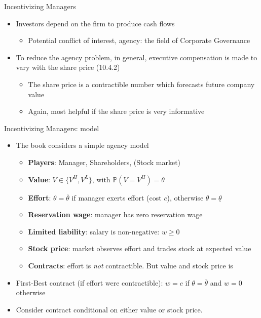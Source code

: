\documentclass[english,10pt
,aspectratio=169
]{beamer}
\begin{document}
\begin{frame}{Incentivizing Managers}
	\begin{itemize}
		\item Investors depend on the firm to produce cash flows 
		\begin{itemize}
			\item Potential conflict of interest, agency: the field of Corporate Governance
		\end{itemize}
		\item To reduce the agency problem, in general, executive compensation is made to vary with the share price (10.4.2)
		\begin{itemize}
			\item The share price is a contractible number which forecasts future company value
			\item Again, most helpful if the share price is very informative
		\end{itemize}
	\end{itemize}
\end{frame}


\begin{frame}{Incentivizing Managers: model}
	\begin{itemize}
		\item The book considers a simple agency model
		\begin{itemize}
			\item \textbf{Players}: Manager, Shareholders, (Stock market)
			\item \textbf{Value}: $V \in \{V^{H}, V^{L}\}$, with $\mathbb{P}(V=V^{H})=\theta$
			\item \textbf{Effort}: $\theta=\overline{\theta}$ if manager exerts effort (cost $c$), otherwise $\theta=\underline{\theta}$
			\item \textbf{Reservation wage}: manager has zero reservation wage
			\item \textbf{Limited liability}: salary is non-negative: $w \geq 0$
			\item \textbf{Stock price}: market observes effort and trades stock at expected value
			\item \textbf{Contracts}: effort is \textit{not} contractible. But value and stock price is
		\end{itemize}
		\item First-Best contract (if effort were contractible): $w=c$ if $\theta=\overline{\theta}$ and $w=0$ otherwise
		\item Consider contract conditional on either value or stock price.
	\end{itemize}
\end{frame}
\end{document}
